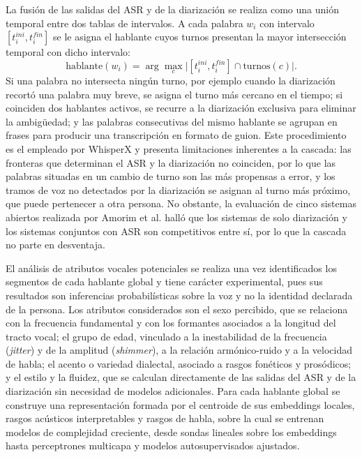 \documentclass[11pt,a4paper]{article}
\newcommand{\lang}[1]{\textit{#1}}
\begin{document}
La fusión de las salidas del ASR y de la diarización se realiza como una unión temporal entre dos tablas de intervalos. A cada palabra $w_i$ con intervalo $[t^{ini}_i,t^{fin}_i]$ se le asigna el hablante cuyos turnos presentan la mayor intersección temporal con dicho intervalo:
\begin{equation}
\mathrm{hablante}(w_i)=\arg\max_{c}\bigl|[t^{ini}_i,t^{fin}_i]\cap\mathrm{turnos}(c)\bigr|.
\end{equation}
Si una palabra no intersecta ningún turno, por ejemplo cuando la diarización recortó una palabra muy breve, se asigna el turno más cercano en el tiempo; si coinciden dos hablantes activos, se recurre a la diarización exclusiva para eliminar la ambigüedad; y las palabras consecutivas del mismo hablante se agrupan en frases para producir una transcripción en formato de guion. Este procedimiento es el empleado por WhisperX y presenta limitaciones inherentes a la cascada: las fronteras que determinan el ASR y la diarización no coinciden, por lo que las palabras situadas en un cambio de turno son las más propensas a error, y los tramos de voz no detectados por la diarización se asignan al turno más próximo, que puede pertenecer a otra persona. No obstante, la evaluación de cinco sistemas abiertos realizada por Amorim et al. \cite{amorim2026} halló que los sistemas de solo diarización y los sistemas conjuntos con ASR son competitivos entre sí, por lo que la cascada no parte en desventaja.

El análisis de atributos vocales potenciales se realiza una vez identificados los segmentos de cada hablante global y tiene carácter experimental, pues sus resultados son inferencias probabilísticas sobre la voz y no la identidad declarada de la persona. Los atributos considerados son el sexo percibido, que se relaciona con la frecuencia fundamental y con los formantes asociados a la longitud del tracto vocal; el grupo de edad, vinculado a la inestabilidad de la frecuencia (\lang{jitter}) y de la amplitud (\lang{shimmer}), a la relación armónico-ruido y a la velocidad de habla; el acento o variedad dialectal, asociado a rasgos fonéticos y prosódicos; y el estilo y la fluidez, que se calculan directamente de las salidas del ASR y de la diarización sin necesidad de modelos adicionales. Para cada hablante global se construye una representación formada por el centroide de sus embeddings locales, rasgos acústicos interpretables y rasgos de habla, sobre la cual se entrenan modelos de complejidad creciente, desde sondas lineales sobre los embeddings hasta perceptrones multicapa y modelos autosupervisados ajustados.
\end{document}

